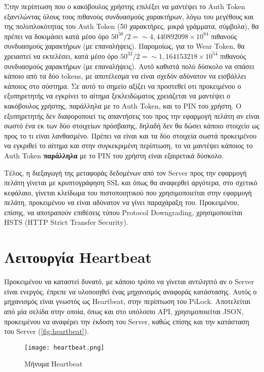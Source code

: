 		Στην περίπτωση που ο κακόβουλος χρήστης επιλέξει να μαντέψει το Auth Token εξαντλώντας όλους τους πιθανούς συνδυασμούς χαρακτήρων, λόγω του μεγέθους και της πολυπλοκότητας του Auth Token (50 χαρακτήρες, μικρά γράμματα, σύμβολα), θα πρέπει να δοκιμάσει κατά μέσο όρο \(50^{50}/2=\sim4,440892098×10^{84}\) πιθανούς συνδυασμούς χαρακτήρων (με επαναλήψεις). Παρομοίως, για το Wear Token, θα χρειαστεί να εκτελέσει, κατά μέσο όρο \(50^{32}/2=\sim1,164153218×10^{54}\) πιθανούς συνδυασμούς χαρακτήρων (με επαναλήψεις). Αυτό καθιστά πολύ δύσκολο να σπάσει κάποιο από τα δύο tokens, με αποτέλεσμα να είναι σχεδόν αδύνατον να εισβάλλει κάποιος στο σύστημα. Σε αυτό το σημείο αξίζει να προστεθεί οτι προκειμένου ο εξυπηρετητής να εγκρίνει το αίτημα ξεκλειδώματος χρειάζεται να μαντέψει ο κακόβουλος χρήστης, παράλληλα με το Auth Token, και το PIN του χρήστη. Ο εξυπηρετητής δεν διαφοροποιεί τις απαντήσεις του προς την εφαρμογή πελάτη αν είναι σωστό ένα εκ των δύο στοιχείων πρόσβασης, δηλαδή δεν θα δώσει κάποιο στοιχείο ως προς το τι είναι λανθασμένο. Πρέπει να είναι και τα δύο στοιχεία σωστά προκειμένου να εγκριθεί το αίτημα και στην συγκεκριμένη περίπτωση, το να μαντέψει κάποιος το Auth Token \textbf{παράλληλα} με το PIN του χρήστη είναι εξαιρετικά δύσκολο.

		Τέλος, η διεξαγωγή της μεταφοράς δεδομένων από τον Server προς την εφαρμογή πελάτη γίνεται με κρυπτογράφηση SSL και όπως θα αναφερθεί αργότερα, στο σχετικό κεφάλαιο, γίνεται κλείδωμα του πιστοποιητικού που χρησιμοποιείται στην εφαρμογή πελάτη, προκειμένου να είναι αδύνατον να γίνει παραχάραξη του. Προκειμένου, επίσης, να αποτραπούν επιθέσεις τύπου Protocol Downgrading, χρησιμοποιείται HSTS (HTTP Strict Transfer Security). 

\section{Λειτουργία Heartbeat}
	\label{sec:heartbeat}
	Προκειμένου να καταστεί δυνατό, με κάποιο τρόπο να γίνεται αντιληπτό αν ο Server είναι ενεργός, έπρεπε να υλοποιηθεί ένας μηχανισμός αναφοράς κατάστασης. Αυτός ο μηχανισμός είναι γνωστός ως Heartbeat, στην περίπτωση του PiLock. Αποτελείται από μία σελίδα στην οποία, όπως και στο υπόλοιπο API, χρησιμοποιείται JSON, προκειμένου να αναφέρει την έκδοση του Server, καθώς επίσης και την κατάσταση του Server (\autoref{fig:heartbeat}). 

	\begin{figure}[h]
	\centering
		\texttt{[image: heartbeat.png]}
	\caption{Μήνυμα Heartbeat}
	\label{fig:heartbeat}
	\end{figure}

